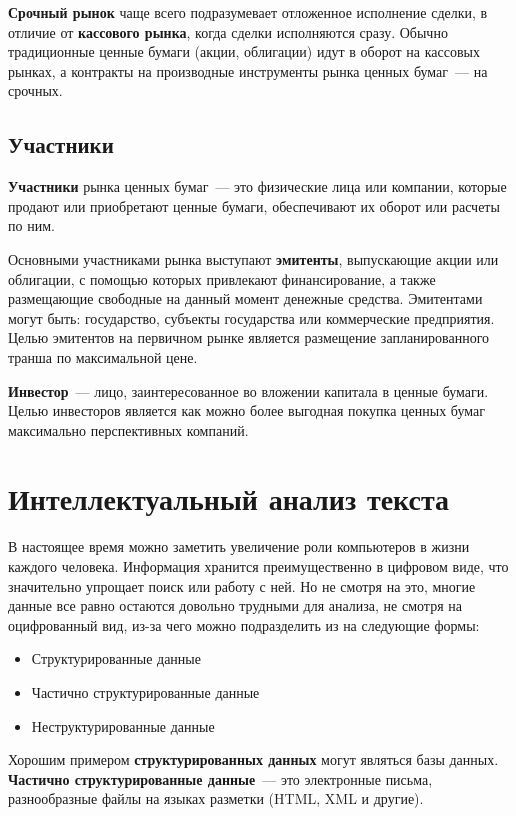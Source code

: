 \documentclass[14pt]{matmex-diploma-custom}
\begin{document}
\textbf{Срочный рынок} чаще всего подразумевает отложенное исполнение сделки, в отличие от \textbf{кассового рынка}, когда сделки исполняются сразу. Обычно традиционные ценные бумаги (акции, облигации) идут в оборот на кассовых рынках, а контракты на производные инструменты рынка ценных бумаг~--- на срочных.

\subsection{Участники}

\textbf{Участники} рынка ценных бумаг~--- это физические лица или компании, которые продают или приобретают ценные бумаги, обеспечивают их оборот или расчеты по ним. 

Основными участниками рынка выступают \textbf{эмитенты}, выпускающие акции или облигации, с помощью которых привлекают финансирование, а также размещающие свободные на данный момент денежные средства. Эмитентами могут быть: государство, субъекты государства или коммерческие предприятия. Целью эмитентов на первичном рынке является размещение запланированного транша по максимальной цене.

\textbf{Инвестор}~--- лицо, заинтересованное во вложении капитала в ценные бумаги. Целью инвесторов является как можно более выгодная покупка ценных бумаг максимально перспективных компаний.

\clearpage\section{Интеллектуальный анализ текста}

\label{sec:analysis}

В настоящее время можно заметить увеличение роли компьютеров в жизни каждого человека. Информация хранится преимущественно в цифровом виде, что значительно упрощает поиск или работу с ней. Но не смотря на это, многие данные все равно остаются довольно трудными для анализа, не смотря на оцифрованный вид, из-за чего можно подразделить из на следующие формы:

\begin{itemize}
\item Структурированные данные
\item Частично структурированные данные
\item Неструктурированные данные
\end{itemize}

Хорошим примером \textbf{структурированных данных} могут являться базы данных. \textbf{Частично структурированные данные}~--- это электронные письма, разнообразные файлы на языках разметки (HTML, XML и другие).
\end{document}
